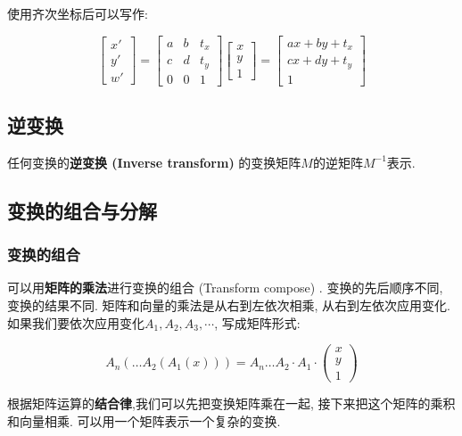 使用齐次坐标后可以写作: 

\begin{equation}
	\begin{bmatrix}x'\\y'\\w'\end{bmatrix}=\begin{bmatrix}a&b&t_x\\c&d&t_y\\0&0&1\end{bmatrix}\begin{bmatrix}x\\y\\1\end{bmatrix}=\begin{bmatrix}ax+by+t_x\\cx+dy+t_y\\1\end{bmatrix}
\end{equation}

\subsection{逆变换}

任何变换的\textbf{逆变换 (Inverse transform) }的变换矩阵$M$的逆矩阵$M^{-1}$表示. 

\subsection{变换的组合与分解}

\subsubsection{变换的组合}

可以用\textbf{矩阵的乘法}进行变换的组合 (Transform compose) . 变换的先后顺序不同, 变换的结果不同. 矩阵和向量的乘法是从右到左依次相乘, 从右到左依次应用变化. 如果我们要依次应用变化$A_1,A_2,A_3,\cdots$, 写成矩阵形式: 

\begin{equation}
	A_n(\dots A_2(A_1(x)))=A_n\dots A_2\cdot A_1\cdot \begin{pmatrix}x\\y\\1\end{pmatrix}
\end{equation}

根据矩阵运算的\textbf{结合律},我们可以先把变换矩阵乘在一起, 接下来把这个矩阵的乘积和向量相乘. 可以用一个矩阵表示一个复杂的变换. 

